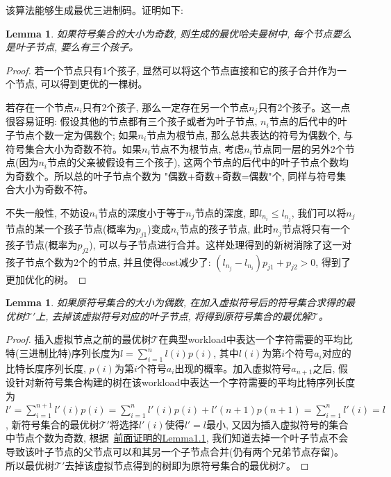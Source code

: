 \documentclass[paper=a4, fontsize=11pt]{scrartcl} %
\numberwithin{equation}{section} %
\numberwithin{figure}{section} %
\numberwithin{table}{section} %
\newtheorem{lemma}[theorem]{Lemma}
\begin{document}
该算法能够生成最优三进制码。证明如下:
\begin{lemma}
  \label{lemma:1}
  如果符号集合的大小为奇数, 则生成的最优哈夫曼树中, 每个节点要么是叶子节点, 要么有三个孩子。
\end{lemma}
\begin{proof}
  若一个节点只有1个孩子, 显然可以将这个节点直接和它的孩子合并作为一个节点, 可以得到更优的一棵树。

  若存在一个节点$n_i$只有2个孩子, 那么一定存在另一个节点$n_j$只有2个孩子。这一点很容易证明: 假设其他的节点都有三个孩子或者为叶子节点, $n_i$节点的后代中的叶子节点个数一定为偶数个; 如果$n_i$节点为根节点, 那么总共表达的符号为偶数个, 与符号集合大小为奇数不符。如果$n_i$节点不为根节点, 考虑$n_i$节点同一层的另外2个节点(因为$n_i$节点的父亲被假设有三个孩子), 这两个节点的后代中的叶子节点个数均为奇数个。所以总的叶子节点个数为 "偶数+奇数+奇数=偶数"个, 同样与符号集合大小为奇数不符。

  不失一般性, 不妨设$n_i$节点的深度小于等于$n_j$节点的深度, 即$l_{n_i} \leq l_{n_j}$, 我们可以将$n_j$节点的某一个孩子节点(概率为$p_{j1}$)变成$n_i$节点的孩子节点, 此时$n_j$节点将只有一个孩子节点(概率为$p_{j2}$), 可以与子节点进行合并。这样处理得到的新树消除了这一对孩子节点个数为2个的节点, 并且使得cost减少了: $(l_{n_j} - l_{n_i})p_{j1} + p_{j2} > 0$, 得到了更加优化的树。
\end{proof}

\begin{lemma}
  如果原符号集合的大小为偶数, 在加入虚拟符号后的符号集合求得的最优树$\mathscr{T'}$上, 去掉该虚拟符号对应的叶子节点, 将得到原符号集合的最优解$\mathscr{T}$。
\end{lemma}
\begin{proof}
  插入虚拟节点之前的最优树$\mathscr{T}$在典型workload中表达一个字符需要的平均比特(三进制比特)序列长度为$l = \sum_{i=1}^{n}{l(i)p(i)}$, 其中$l(i)$为第$i$个符号$a_i$对应的比特长度序列长度, $p(i)$为第$i$个符号$a_i$出现的概率。加入虚拟符号$a_{n+1}$之后, 假设针对新符号集合构建的树在该workload中表达一个字符需要的平均比特序列长度为$l' = \sum_{i=1}^{n+1}{l'(i)p(i)} = \sum_{i=1}^{n}{l'(i)p(i)} + l'(n+1)p(n+1) = \sum_{i=1}^{n}{l'(i)} = l$, 新符号集合的最优树$\mathscr{T'}$将选择$l'(i)$使得$l'=l$最小, 又因为插入虚拟符号的集合中节点个数为奇数, 根据~\hyperref[lemma:1]{前面证明的Lemma1.1}, 我们知道去掉一个叶子节点不会导致该叶子节点的父节点可以和其另一个子节点合并(仍有两个兄弟节点存留)。 所以最优树$\mathscr{T'}$去掉该虚拟节点得到的树即为原符号集合的最优树$\mathscr{T}$。
\end{proof}
\end{document}
